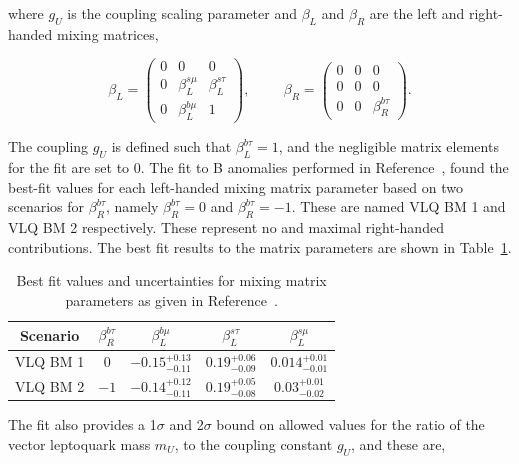 where $g_{U}$ is the coupling scaling parameter and $\beta_{L}$ and $\beta_{R}$ are the left and right-handed mixing matrices,

\begin{equation}
\beta_{L} = 
\begin{pmatrix}
0 & 0 & 0 \\
0 & \beta_{L}^{s\mu} & \beta_{L}^{s\tau} \\
0 & \beta_{L}^{b\mu} & 1
\end{pmatrix},
\hspace{1cm}
\beta_{R} = 
\begin{pmatrix}
0 & 0 & 0 \\
0 & 0 & 0 \\
0 & 0 & \beta_{R}^{b\tau}
\end{pmatrix}.
\end{equation}

The coupling $g_{U}$ is defined such that $\beta_{L}^{b\tau}=1$, and the negligible matrix elements for the fit are set to 0.
The fit to B anomalies performed in Reference~\cite{Cornella:2021sby}, found the best-fit values for each left-handed mixing matrix parameter based on two scenarios for $\beta^{b\tau}_{R}$, namely $\beta^{b\tau}_{R} = 0$ and $\beta^{b\tau}_{R} = -1$.
These are named VLQ BM 1 and VLQ BM 2 respectively.
These represent no and maximal right-handed contributions. 
The best fit results to the matrix parameters are shown in Table~\ref{tab:vlq_bestfit}.

\begin{table}[h]
\centering
\begin{tabular}{|c|c||c|c|c|}
\hline
Scenario & $\beta^{b\tau}_{R}$ & $\beta^{b\mu}_{L}$ & $\beta^{s\tau}_{L}$ & $\beta^{s\mu}_{L}$ \\
\hline
\hline
VLQ BM 1 & $0$ & $-0.15^{+0.13}_{-0.11}$ & $0.19^{+0.06}_{-0.09}$ & $0.014^{+0.01}_{-0.01}$ \\
VLQ BM 2 & $-1$ & $-0.14^{+0.12}_{-0.11}$ & $0.19^{+0.05}_{-0.08}$ & $0.03^{+0.01}_{-0.02}$ \\
\hline
\end{tabular}
\caption{Best fit values and uncertainties for mixing matrix parameters as given in Reference~\cite{Cornella:2021sby}.}
\label{tab:vlq_bestfit}
\end{table}

The fit also provides a 1$\sigma$ and 2$\sigma$ bound on allowed values for the ratio of the vector leptoquark mass $m_{U}$, to the coupling constant $g_{U}$, and these are,

